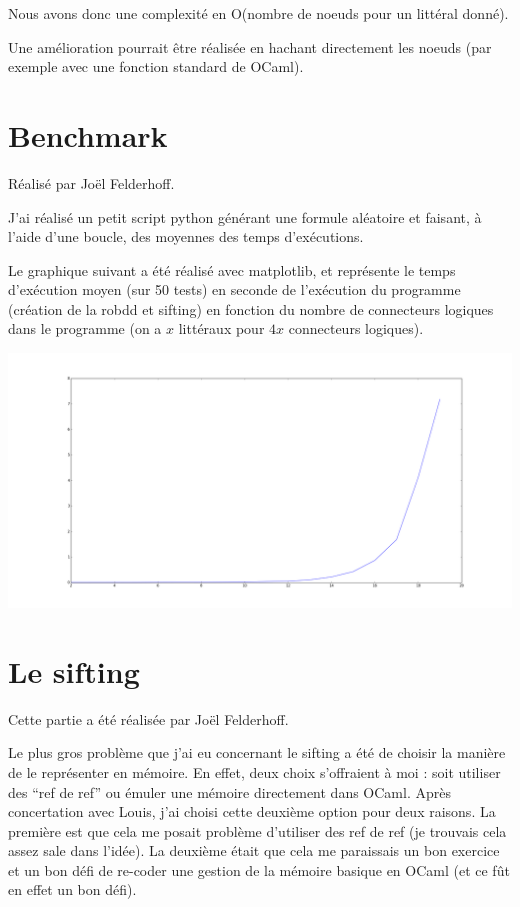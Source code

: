 \documentclass[a4paper,10pt]{article}
\begin{document}
Nous avons donc une complexité en O(nombre de noeuds pour un littéral donné).

Une amélioration pourrait être réalisée en hachant directement les noeuds (par exemple avec une fonction standard de OCaml).

\section{Benchmark}
Réalisé par Joël Felderhoff.

J'ai réalisé un petit script python générant une formule aléatoire et faisant, à l'aide d'une boucle, des moyennes des temps d'exécutions.

Le graphique suivant a été réalisé avec matplotlib, et représente le temps d'exécution moyen (sur 50 tests) en seconde de l'exécution du programme (création de la robdd et sifting) en fonction du nombre de
connecteurs logiques dans le programme (on a $x$ littéraux pour $4x$ connecteurs logiques).

\begin{center}
\includegraphics[width=450pt]{benchmark.png}
\end{center}

\section{Le sifting}
Cette partie a été réalisée par Joël Felderhoff.

Le plus gros problème que j'ai eu concernant le sifting a été de choisir la manière de le représenter en mémoire.
En effet, deux choix s'offraient à moi : soit utiliser des ``ref de ref'' ou émuler une mémoire directement dans OCaml. Après concertation avec Louis, j'ai choisi
cette deuxième option pour deux raisons. La première est que cela me posait problème d'utiliser des ref de ref (je trouvais cela assez sale dans l'idée). La deuxième était que cela me
paraissais un bon exercice et un bon défi de re-coder une gestion de la mémoire basique en OCaml (et ce fût en effet un bon défi).
\end{document}
